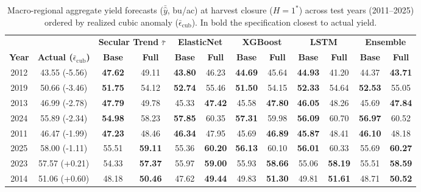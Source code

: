 \begin{table}[htbp]
\centering
\singlespacing
\scriptsize
\setlength{\tabcolsep}{3.0pt}
\renewcommand{\arraystretch}{1.06}
\caption{Macro-regional aggregate yield forecasts ($\bar{\hat{y}}$, bu/ac) at harvest closure ($H = 1^*$) across test years (2011--2025) ordered by realized cubic anomaly ($\bar{\epsilon}_{\text{cub}}$). In bold the specification closest to actual yield.}
\label{tab:appendix_yearly_raw_yields}
\begin{tabular*}{\textwidth}{@{\extracolsep{\fill}} c c cc cc cc cc cc @{}}
\toprule
& & \multicolumn{2}{c}{\textbf{Secular Trend } $\bar{\tau}$} & \multicolumn{2}{c}{\textbf{ElasticNet}} & \multicolumn{2}{c}{\textbf{XGBoost}} & \multicolumn{2}{c}{\textbf{LSTM}} & \multicolumn{2}{c}{\textbf{Ensemble}} \\
\cmidrule(lr){3-4}\cmidrule(lr){5-6}\cmidrule(lr){7-8}\cmidrule(lr){9-10}\cmidrule(lr){11-12}
\textbf{Year} & \textbf{Actual ($\bar{\epsilon}_{\text{cub}}$)} & \textbf{Base} & \textbf{Full} & \textbf{Base} & \textbf{Full} & \textbf{Base} & \textbf{Full} & \textbf{Base} & \textbf{Full} & \textbf{Base} & \textbf{Full} \\
\midrule
2012 & 43.55 {\tiny (-5.56)} & \textbf{47.62} & 49.11 & \textbf{43.80} & 46.23 & \textbf{44.69} & 45.64 & \textbf{44.93} & 41.20 & 44.37 & \textbf{43.71} \\
2019 & 50.66 {\tiny (-3.46)} & \textbf{51.75} & 54.12 & \textbf{52.74} & 55.46 & \textbf{51.50} & 54.15 & \textbf{52.33} & 54.64 & \textbf{52.53} & 55.05 \\
2013 & 46.99 {\tiny (-2.78)} & \textbf{47.79} & 49.78 & 45.33 & \textbf{47.42} & 45.58 & \textbf{47.80} & \textbf{46.05} & 48.26 & 45.69 & \textbf{47.84} \\
2024 & 55.89 {\tiny (-2.34)} & \textbf{54.98} & 58.23 & \textbf{57.85} & 60.35 & \textbf{57.31} & 59.98 & \textbf{56.09} & 60.70 & \textbf{56.97} & 60.52 \\
2011 & 46.47 {\tiny (-1.99)} & \textbf{47.23} & 48.46 & \textbf{46.34} & 47.95 & 45.69 & \textbf{46.89} & \textbf{45.87} & 48.41 & \textbf{46.10} & 48.18 \\
2025 & 58.00 {\tiny (-1.11)} & 55.51 & \textbf{59.11} & 55.36 & \textbf{60.20} & \textbf{56.13} & 60.10 & \textbf{56.01} & 60.33 & 55.69 & \textbf{60.27} \\
2023 & 57.57 {\tiny (+0.21)} & 54.33 & \textbf{57.37} & 55.97 & \textbf{59.00} & 55.93 & \textbf{58.66} & 55.06 & \textbf{58.19} & 55.51 & \textbf{58.59} \\
2014 & 51.06 {\tiny (+0.60)} & 48.18 & \textbf{50.46} & 47.62 & \textbf{49.44} & 49.83 & \textbf{51.30} & 49.81 & \textbf{51.61} & 48.71 & \textbf{50.52} \\

\end{tabular*}
\end{table}
